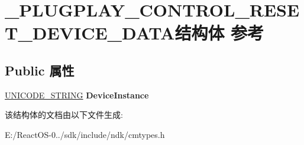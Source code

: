 \hypertarget{struct___p_l_u_g_p_l_a_y___c_o_n_t_r_o_l___r_e_s_e_t___d_e_v_i_c_e___d_a_t_a}{}\section{\+\_\+\+P\+L\+U\+G\+P\+L\+A\+Y\+\_\+\+C\+O\+N\+T\+R\+O\+L\+\_\+\+R\+E\+S\+E\+T\+\_\+\+D\+E\+V\+I\+C\+E\+\_\+\+D\+A\+T\+A结构体 参考}
\label{struct___p_l_u_g_p_l_a_y___c_o_n_t_r_o_l___r_e_s_e_t___d_e_v_i_c_e___d_a_t_a}
\subsection*{Public 属性}
\begin{DoxyCompactItemize}
\item 
\mbox{\label{struct___p_l_u_g_p_l_a_y___c_o_n_t_r_o_l___r_e_s_e_t___d_e_v_i_c_e___d_a_t_a_a9bcc47387133dd2059088dfd190fedd5}} 
\hyperlink{struct___u_n_i_c_o_d_e___s_t_r_i_n_g}{U\+N\+I\+C\+O\+D\+E\+\_\+\+S\+T\+R\+I\+NG} {\bfseries Device\+Instance}
\end{DoxyCompactItemize}


该结构体的文档由以下文件生成\+:\begin{DoxyCompactItemize}
\item 
E\+:/\+React\+O\+S-\/0../sdk/include/ndk/cmtypes.\+h\end{DoxyCompactItemize}
